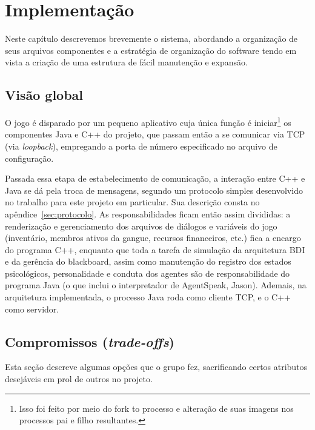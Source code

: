\chapter{Implementação}

Neste capítulo descrevemos brevemente o sistema, abordando a organização de seus arquivos componentes e a estratégia de organização do software tendo em vista a criação de uma estrutura de fácil manutenção e expansão.

\section{Visão global}

O jogo é disparado por um pequeno aplicativo cuja única função é iniciar\footnote{Isso foi feito por meio do fork to processo e alteração de suas imagens nos processos pai e filho resultantes.} os componentes Java e C++ do projeto, que passam então a se comunicar via TCP (via \emph{loopback}), empregando a porta de número especificado no arquivo de configuração.

Passada essa etapa de estabelecimento de comunicação, a interação entre C++ e Java se dá pela troca de mensagens, segundo um protocolo simples desenvolvido no trabalho para este projeto em particular. Sua descrição consta no apêndice~\ref{sec:protocolo}. As responsabilidades ficam então assim divididas: a renderização e gerenciamento dos arquivos de diálogos e variáveis do jogo (inventário, membros ativos da gangue, recursos financeiros, etc.) fica a encargo do programa C++, enquanto que toda a tarefa de simulação da arquitetura  BDI e da gerência do blackboard, assim como manutenção do registro dos estados psicológicos, personalidade e conduta dos agentes são de responsabilidade do programa Java (o que inclui o interpretador de AgentSpeak, Jason). Ademais, na arquitetura implementada, o processo Java roda como cliente TCP, e o C++ como servidor.



\section{Compromissos (\emph{trade-offs})}\label{sec:tradeoffs}

Esta seção descreve algumas opções que o grupo fez, sacrificando certos atributos desejáveis em prol de outros no projeto. 

